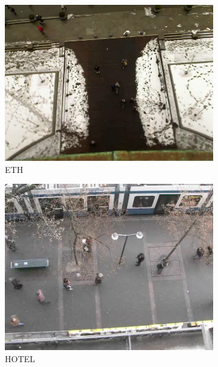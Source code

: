 \begin{figure}[hbtp]
  \centering
  \begin{subfigure}{0.24\textwidth}
    \centering
    \includegraphics[keepaspectratio, scale=0.133]{images/eth.png}
    \caption{ETH}
    \label{Fig:datasets1}
  \end{subfigure}
  \hfill
  \begin{subfigure}{0.24\textwidth}
    \centering
    \includegraphics[keepaspectratio, scale=0.11]{images/hotel.png}
    \caption{HOTEL}
    \label{Fig:datasets2}
  \end{subfigure}
  \hfill
  \begin{subfigure}{0.24\textwidth}

\end{subfigure}
\end{figure}
